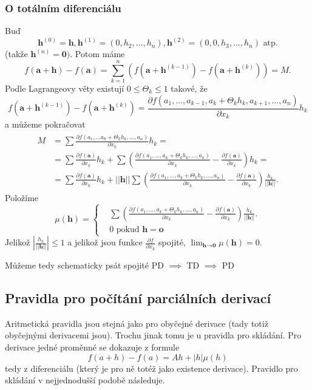 \documentclass[../main.tex]{subfiles}
\begin{document}
\subsubsection{O totálním diferenciálu}
Buď
\[\textbf{h}^{(0)} = \textbf{h}, \textbf{h}^{(1)} = (0, h_2,...,h_n), \textbf{h}^{(2)} = (0,0,h_3,...,h_n) \textrm{ atp.} \]
(takže $\textbf{h}^{(n)} = \textbf{0})$.
Potom máme
\[f(\textbf{a}+\textbf{h}) - f(\textbf{a}) = \sum^n_{k=1}(f(\textbf{a}+\textbf{h}^{(k-1)})-f(\textbf{a}+\textbf{h}^{(k)})) = M.\]
Podle Lagrangeovy věty existují $0 \leq \Theta_k \leq 1$ takové, že
\[f(\textbf{a}+\textbf{h}^{(k-1)})-f(\textbf{a}+\textbf{h}^{(k)}) = \frac{\partial f(a_1,...,a_{k-1},a_k+ \Theta_kh_k,a_{k+1},...,a_n)}{\partial x_k}h_k\]
a můžeme pokračovat
\begin{align*} 
	\begin{split}
		M & = \sum\frac{\partial f(a_1,...a_k+\Theta_kh_k,...,a_n)}{\partial x_k}h_k = \\
		 & = \sum \frac{\partial f(\textbf{a})}{\partial x_k}h_k + \sum \left( \frac{\partial f(a_1,...,a_k+\Theta_kh_k,...,a_n)}{\partial x_k}
		 - \frac{\partial f(\textbf{a})}{\partial x_k} \right)h_k = \\
		 & = \sum \frac{\partial f(\textbf{a})}{\partial x_k}h_k + ||\textbf{h}||\sum\left(\frac{\partial f(a_1,...,a_k+\Theta_kh_k,...,a_n)}
		 {\partial x_k}- \frac{\partial f(\textbf{a})}{\partial x_k}\right)\frac{h_k}{||\textbf{h}||}.
	\end{split}
\end{align*}
Položíme
\[\mu (\textbf{h}) =
    \begin{cases} & \sum\left(\frac{\partial f(a_1,...,a_k+\Theta_kh_k,...,a_n)}{\partial x_k} -
    \frac{\partial f(\textbf{a})}{\partial x_k} \right)\frac{h_k}{||\textbf{h}||}.\\
    & 0 \text{ pokud } \mathbf{h} = \mathbf{o}
    \end{cases}\]
Jelikož $\left|\frac{h_k}{||\textbf{h}||}\right| \leq 1$ a jelikož jsou funkce $\frac{\partial f}{\partial x_k}$ spojité,
$\lim_{\textbf{h}\rightarrow \textbf{0}} \mu (\textbf{h}) = 0$.
\begin{center}
\LARGE 
Můžeme tedy schematicky psát spojité PD $\implies$ TD $\implies$ PD
\end{center}

\subsection{Pravidla pro počítání parciálních derivací}
Aritmetická pravidla jsou stejná jako pro obyčejné derivace (tady totiž obyčejnými derivacemi jsou).
Trochu jinak tomu je u pravidla pro skládání. Pro derivace jedné proměnné se dokazuje z formule
\[ f(a+h) - f(a) = Ah + |h|\mu (h) \]
tedy z diferenciálu (který je pro ně totéž jako existence derivace).
Pravidlo pro skládání v nejjednodušší podobě následuje.
\end{document}
